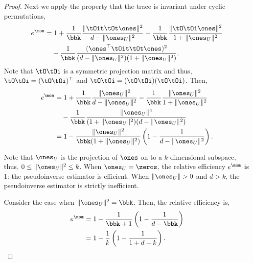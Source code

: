 \begin{proof}
Next we apply the property that the trace is invariant under cyclic
permutations,
\begin{align*}
  e^\mom
    &= 1 + \frac{1}{\bbk}
          \frac{
              \|\tOit \tOt \ones\|^2
          }{
            d - \|\ones_U\|^2 
          } 
        - \frac{1}{\bbk}
        \frac{\|\tO \tOi \ones\|^2}{1+ \|\ones_U\|^2} \\
    &\quad
    - \frac{1}{\bbk}
    \frac{(\ones^\top \tOit \tOt \ones)^2}
        {(d - \|\ones_U\|^2 ) (1+ \|\ones_U\|^2)}.
      \end{align*}
Note that $\tO\tOi$ is a symmetric projection matrix and thus, $\tO\tOi
      = (\tO\tOi)^\top$ and $\tO\tOi = (\tO\tOi)(\tO\tOi)$. Then,
      \begin{align*}
        e^\mom
&= 1
+ \frac{1}{\bbk} \frac{\|\ones_U\|^2}{d - \|\ones_U\|^2}
    -  \frac{1}{\bbk}\frac{\|\ones_U\|^2}{1 + \|\ones_U\|^2}\\
&\quad
    -  \frac{1}{\bbk}\frac{\|\ones_U\|^4}{(1 + \|\ones_U\|^2)(d - \|\ones_U\|^2)} \\
    &= 1 - \frac{\|\ones_U\|^2}{\bbk (1 + \|\ones_U\|^2)} \left( 1 - \frac{1}{d - \|\ones_U\|^2} \right).
\end{align*}

Note that $\ones_U$ is the projection of $\ones$ on to a $k$-dimensional
subspace, thus, $0 \le \|\ones_U\|^2 \le k$.
When $\ones_U = \zeros$, the relative efficiency $e^\mom$ is $1$: the pseudoinverse estimator is efficient. When $\|\ones_U\| > 0$ and $d > k$, the pseudoinverse estimator is strictly inefficient.

Consider the case when $\|\ones_U\|^2 = \bbk$. Then, the relative efficiency
is,
\begin{align*}
  e^\mom 
    &= 1 - \frac{1}{\bbk +1} \left(1 - \frac{1}{d - \bbk} \right) \\
    &= 1 - \frac{1}{k} \left(1 - \frac{1}{1 + d - k} \right).
\end{align*}
%
\end{proof}



